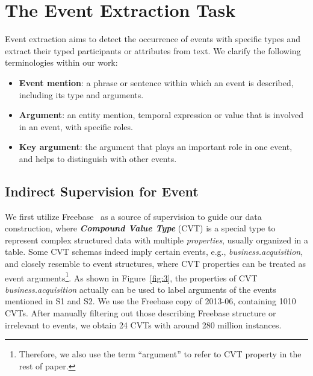 \section{The Event Extraction Task}
Event extraction aims to detect the occurrence of events with specific types and extract their typed participants or attributes from text. We clarify the following terminologies within our work:
\begin{itemize}
	\item \textbf{Event mention}: a phrase or sentence within which an event is described, including its type and arguments.
	\item \textbf{Argument}: an entity mention, temporal expression or value that is involved in an event, with specific roles.
	\item \textbf{Key argument}: the argument that plays an important role in one event, and helps to distinguish with other events. %
\end{itemize}

\subsection{Indirect Supervision for Event}%
We first utilize Freebase~\cite{bollacker2008freebase} as a source of supervision to guide our data construction, %
where \textbf{\emph{Compound Value Type}} (CVT) is a special type to represent complex structured data %
with multiple \emph{properties}, usually organized in a table. Some CVT schemas indeed imply certain events, e.g., \emph{business.acquisition},
and closely resemble to event structures, where CVT properties can be treated as event arguments\footnote{
Therefore, we also use the term ``argument'' to refer to CVT property in the rest of paper.}. %
As shown in Figure~\ref{fig:3}, the properties of CVT \emph{business.acquisition} actually can be used to label arguments of the events mentioned in S1 and S2. 
We use the Freebase copy of 2013-06,  %
containing 1010 CVTs. After manually filtering out those %
describing Freebase structure or irrelevant to events, %
 we obtain 24 CVTs with around 280 million instances.

